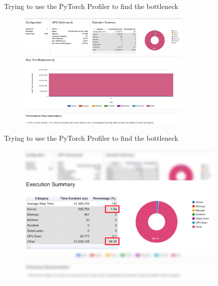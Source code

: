 \documentclass[compress,aspectratio=169]{beamer}
\begin{document}
\begin{frame}{Trying to use the PyTorch Profiler to find the bottleneck}
	\vspace{-1em}
    \begin{center}
    \begin{figure}
        \includegraphics[width=0.75\textwidth]{../../data/scap_gtx1080_profiler-torch_sample-points_14650750}
    \end{figure}
    \end{center}
\end{frame}

\begin{frame}{Trying to use the PyTorch Profiler to find the bottleneck}
    \vspace{-1em}
    \begin{center}
    \begin{figure}
        \includegraphics[width=0.9\textwidth]{../../data/scap_gtx1080_profiler-torch_sample-points_14650750_execution-time}
    \end{figure}
    \end{center}
\end{frame}
\end{document}
